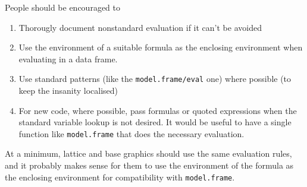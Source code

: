 \documentclass[11pt]{article}
\begin{document}
People should be encouraged to 
\begin{enumerate}
\item Thorougly document nonstandard evaluation if it can't be avoided
\item Use the environment of a suitable formula as the enclosing environment when evaluating in a data frame.
\item Use standard patterns (like the  \verb=model.frame/eval= one) where possible  (to keep the insanity localised)
\item For new code, where possible, pass formulas or quoted expressions when the standard variable lookup is not desired. It would be useful to have a single function like \texttt{model.frame} that does the necessary evaluation. 
\end{enumerate}

At a minimum, lattice and base graphics should use the same evaluation rules, and it probably makes sense for them to use the  environment of the formula as the enclosing environment for compatibility with \verb=model.frame=.

 
\end{document}
